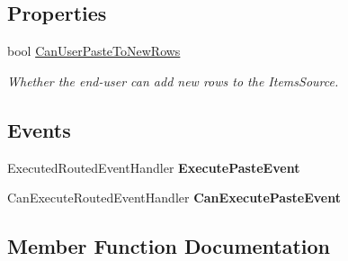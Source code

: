 \subsection*{Properties}
\begin{DoxyCompactItemize}
\item 
bool \hyperlink{class_power_system_planning_wpf_app_1_1_control_utils_1_1_custom_data_grid_a3444d83edb40c95ccf9aca14ffe6f3ce}{Can\+User\+Paste\+To\+New\+Rows}
\begin{DoxyCompactList}\small\item\em Whether the end-\/user can add new rows to the Items\+Source. \end{DoxyCompactList}\end{DoxyCompactItemize}
\subsection*{Events}
\begin{DoxyCompactItemize}
\item 
Executed\+Routed\+Event\+Handler {\bfseries Execute\+Paste\+Event}\hypertarget{class_power_system_planning_wpf_app_1_1_control_utils_1_1_custom_data_grid_a221845278a5720637f3018528b55a841}{}\label{class_power_system_planning_wpf_app_1_1_control_utils_1_1_custom_data_grid_a221845278a5720637f3018528b55a841}

\item 
Can\+Execute\+Routed\+Event\+Handler {\bfseries Can\+Execute\+Paste\+Event}\hypertarget{class_power_system_planning_wpf_app_1_1_control_utils_1_1_custom_data_grid_abdc4b5da0ef2b3b3f2a36ce995d2d313}{}\label{class_power_system_planning_wpf_app_1_1_control_utils_1_1_custom_data_grid_abdc4b5da0ef2b3b3f2a36ce995d2d313}

\end{DoxyCompactItemize}


\subsection{Member Function Documentation}
